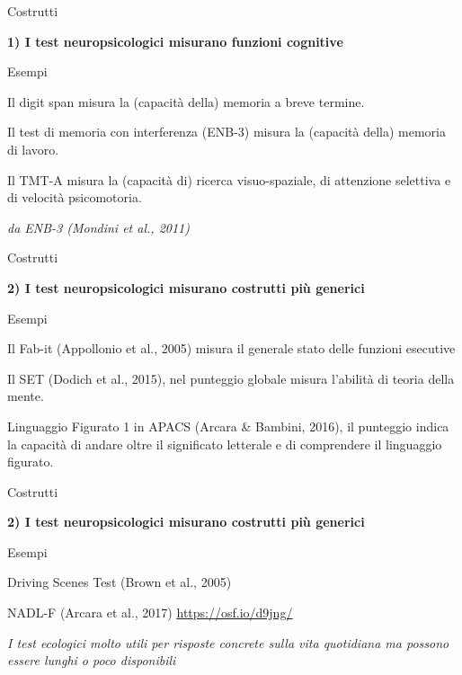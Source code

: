 \documentclass[
  ignorenonframetext,
]{beamer}
\begin{document}
\begin{frame}{Costrutti}
\label{costrutti-2}
\begin{center}
  \textbf{1) I test neuropsicologici misurano funzioni cognitive}
\end{center}
\vspace{2em}

Esempi

Il digit span misura la (capacità della) memoria a breve termine.

Il test di memoria con interferenza (ENB-3) misura la (capacità della)
memoria di lavoro.

Il TMT-A misura la (capacità di) ricerca visuo-spaziale, di attenzione
selettiva e di velocità psicomotoria.

\begin{flushright}
  \textit{da ENB-3 (Mondini et al., 2011)}
\end{flushright}
\end{frame}

\begin{frame}{Costrutti}
\label{costrutti-3}
\begin{center}
  \textbf{2) I test neuropsicologici misurano costrutti più generici}
\end{center}
\vspace{2em}

Esempi

Il Fab-it (Appollonio et al., 2005) misura il generale stato delle
funzioni esecutive

Il SET (Dodich et al., 2015), nel punteggio globale misura l'abilità di
teoria della mente.

Linguaggio Figurato 1 in APACS (Arcara \& Bambini, 2016), il punteggio
indica la capacità di andare oltre il significato letterale e di
comprendere il linguaggio figurato.
\end{frame}

\begin{frame}{Costrutti}
\label{costrutti-4}
\begin{center}
  \textbf{2) I test neuropsicologici misurano costrutti più generici}
\end{center}
\vspace{2em}

Esempi

Driving Scenes Test (Brown et al., 2005)

NADL-F (Arcara et al., 2017)
\href{https://osf.io/d9jng/}{\ul{https://osf.io/d9jng/}} \vspace{2em}

\emph{I test ecologici molto utili per risposte concrete sulla vita
quotidiana ma possono essere lunghi o poco disponibili}
\end{frame}
\end{document}
